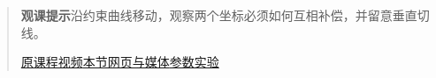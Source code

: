 \begin{quote}\small\textbf{观课提示}\quad 沿约束曲线移动，观察两个坐标必须如何互相补偿，并留意垂直切线。

\href{https://www.youtube.com/watch?v=qb40J4N1fa4}{原课程视频}\quad\href{https://vitael04213.github.io/3blue1brown-notes/lessons/implicit-differentiation.html}{本节网页与媒体}\quad\href{https://vitael04213.github.io/3blue1brown-notes/lab.html\#complex}{参数实验}
\end{quote}
